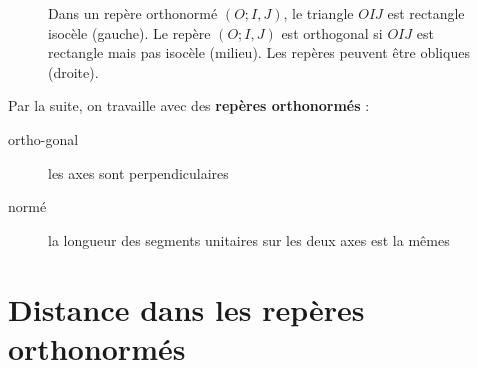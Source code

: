 \begin{figure}[hb]
	\caption{Dans un repère orthonormé $(O;I,J)$, le triangle $OIJ$ est rectangle isocèle (gauche). Le repère $(O;I,J)$ est orthogonal si $OIJ$ est rectangle mais pas isocèle (milieu). Les repères peuvent être obliques (droite).}
\end{figure}


Par la suite, on travaille avec des \textbf{repères orthonormés} : 
\begin{description}
	\item[ortho-gonal]  les axes sont perpendiculaires
	\item[normé] la longueur des segments unitaires sur les deux axes est la mêmes
\end{description}

%	 
\newpage 
\section{Distance dans les repères orthonormés}

